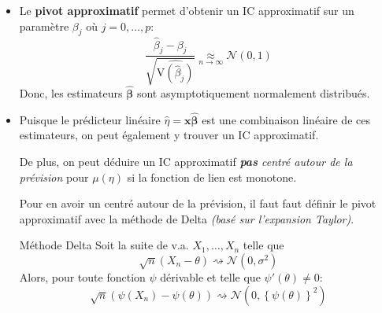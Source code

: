 \documentclass[10pt, french]{article}
\begin{document}
\begin{multicols*}{3}
\begin{itemize}
	\item	Le \textbf{pivot approximatif} permet d'obtenir un IC approximatif sur un paramètre $\beta_{j}$ où $j = 0, \dots, p$:
	\begin{equation*}
		\frac{\hat{\beta}_{j} - \beta_{j}}{\sqrt{\widehat{\text{V}(\hat{\beta}_{j})}}}
		\underset{n \rightarrow \infty}{\approx} \mathcal{N}(0, 1)
	\end{equation*}
	Donc, les estimateurs $\bm{\hat{\beta}}$ sont asymptotiquement normalement distribués.
	\item	Puisque le prédicteur linéaire $\hat{\eta} = \bm{x}\bm{\hat{\beta}}$ est une combinaison linéaire de ces estimateurs, on peut également y trouver un IC approximatif.
	
	De plus, on peut déduire un IC approximatif \textit{\textbf{pas} centré autour de la prévision} pour $\mu(\eta)$ si la fonction de lien est monotone.
	
	Pour en avoir un centré autour de la prévision, il faut faut définir le pivot approximatif avec la méthode de Delta \textit{(basé sur l'expansion Taylor)}.
	
	\begin{formula}{Méthode Delta}
	Soit la suite de v.a. $X_{1}, \dots, X_{n}$ telle que
	\begin{equation*}
		\sqrt{n}(X_{n} - \theta) \rightsquigarrow \mathcal{N}(0, \sigma^{2})
	\end{equation*}
	Alors, pour toute fonction $\psi$ dérivable et telle que $\psi'(\theta) \neq 0$:
	\begin{equation*}
		\sqrt{n}(\psi(X_{n}) - \psi(\theta)) \rightsquigarrow \mathcal{N}(0, \left\{\psi(\theta)\right\}^{2})
	\end{equation*}
	\end{formula}


	
	

\end{itemize}
\end{multicols*}
\end{document}
